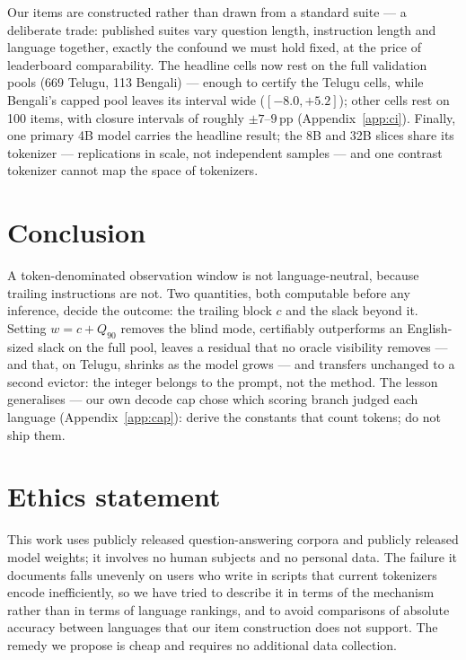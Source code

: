 \documentclass{article}
\begin{document}
Our items are constructed rather than drawn from a standard suite
--- a deliberate trade: published suites vary question length,
instruction length and language together, exactly the confound we
must hold fixed, at the price of leaderboard comparability. The
headline cells now rest on the full validation pools (669 Telugu, 113
Bengali) --- enough to certify the Telugu cells, while Bengali's
capped pool leaves its interval wide ($[-8.0,+5.2]$); other cells
rest on 100 items, with closure intervals of roughly
$\pm 7$--$9$\,pp (Appendix~\ref{app:ci}). Finally, one primary 4B
model carries the headline result; the 8B and 32B slices share its
tokenizer --- replications in scale, not independent samples --- and
one contrast tokenizer cannot map the space of tokenizers.

\section{Conclusion}

A token-denominated observation window is not language-neutral,
because trailing instructions are not. Two quantities, both
computable before any inference, decide the outcome: the trailing
block $c$ and the slack beyond it. Setting
$w = c + Q_{90}$ removes the blind mode, certifiably outperforms an
English-sized slack on the full pool, leaves a residual that no oracle
visibility removes --- and that, on Telugu, shrinks as the model grows --- and
transfers unchanged to a second evictor: the integer belongs to the
prompt, not the method. The lesson generalises --- our own decode cap
chose which scoring branch judged each language
(Appendix~\ref{app:cap}): derive the constants that count tokens; do
not ship them.

\section*{Ethics statement}
This work uses publicly released question-answering corpora and publicly
released model weights; it involves no human subjects and no personal
data. The failure it documents falls unevenly on users who write in
scripts that current tokenizers encode inefficiently, so we have tried
to describe it in terms of the mechanism rather than in terms of language
rankings, and to avoid comparisons of absolute accuracy between languages
that our item construction does not support. The remedy we propose is
cheap and requires no additional data collection.
\end{document}

